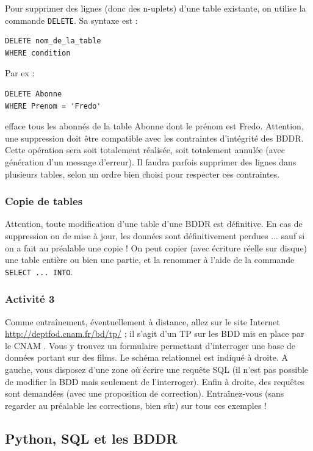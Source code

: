 \documentclass[french,11pt,twoside]{VcCours}
\begin{document}
Pour supprimer des lignes (donc des n-uplets) d'une table existante, on utilise la commande \verb'DELETE'. Sa syntaxe est :
\begin{verbatim}
DELETE nom_de_la_table 
WHERE condition
\end{verbatim}
Par ex : 
\begin{verbatim}
DELETE Abonne 
WHERE Prenom = 'Fredo'
\end{verbatim}
efface tous les abonnés de la table Abonne dont le prénom est Fredo. Attention, une suppression doit être compatible avec les contraintes d'intégrité des BDDR. Cette opération sera soit totalement réalisée, soit totalement annulée (avec génération d'un message d'erreur). Il faudra parfois supprimer des lignes dans plusieurs tables, selon un ordre bien choisi pour respecter ces contraintes.


\subsubsection*{Copie de tables}

Attention, toute modification d'une table d'une BDDR est définitive.  En cas de suppression ou de mise à jour, les données sont définitivement perdues ... sauf si on a fait au préalable une copie ! On peut copier (avec écriture réelle sur disque) une table entière ou bien une partie, et la renommer à l'aide de la commande \verb'SELECT ... INTO'.


\subsubsection*{Activité 3}

Comme entraînement, éventuellement à distance, allez sur le site Internet \url{http://deptfod.cnam.fr/bd/tp/} ; il s'agit d'un TP sur les BDD mis en place par le CNAM %
. Vous y trouvez un formulaire permettant d'interroger une base de données portant sur des films. Le schéma relationnel est indiqué à droite. A gauche, vous disposez d'une zone où écrire une requête SQL (il n'est pas possible de modifier la BDD mais seulement de l'interroger). Enfin à droite, des requêtes sont demandées (avec une proposition de correction). Entraînez-vous (sans regarder au préalable les corrections, bien sûr) sur tous ces exemples !


\subsection{Python, SQL et les BDDR}
\end{document}
